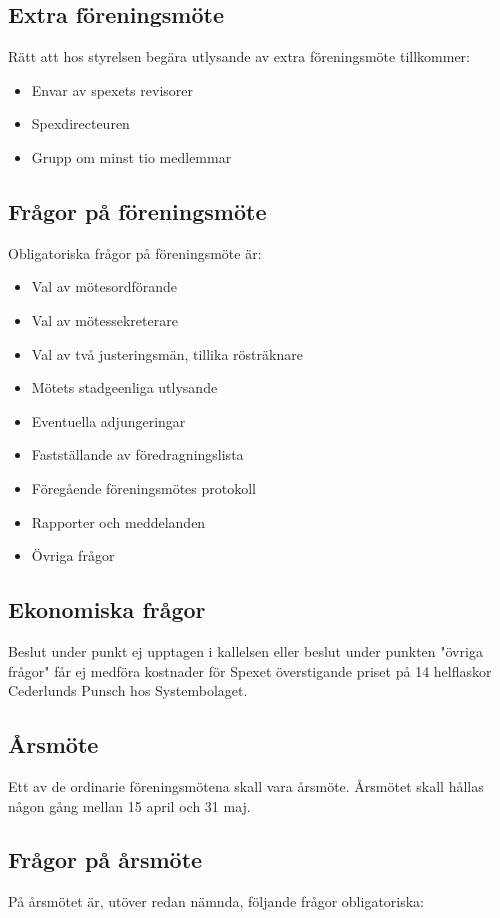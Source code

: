 \documentclass[a4paper]{article}
\begin{document}
\subsection{Extra föreningsmöte}
Rätt att hos styrelsen begära utlysande av extra föreningsmöte tillkommer:

\begin{itemize}
  \item Envar av spexets revisorer
  \item Spexdirecteuren
  \item Grupp om minst tio medlemmar
\end{itemize}

\subsection{Frågor på föreningsmöte}
Obligatoriska frågor på föreningsmöte är:

\begin{itemize}
  \item Val av mötesordförande
  \item Val av mötessekreterare
  \item Val av två justeringsmän, tillika rösträknare
  \item Mötets stadgeenliga utlysande
  \item Eventuella adjungeringar
  \item Fastställande av föredragningslista
  \item Föregående föreningsmötes protokoll
  \item Rapporter och meddelanden
  \item Övriga frågor
\end{itemize}

\subsection{Ekonomiska frågor}
Beslut under punkt ej upptagen i kallelsen eller beslut under punkten "övriga frågor" får ej medföra kostnader för Spexet överstigande priset på 14 helflaskor Cederlunds Punsch hos Systembolaget.

\subsection{Årsmöte}
Ett av de ordinarie föreningsmötena skall vara årsmöte. Årsmötet skall hållas någon gång mellan 15 april och 31 maj.

\subsection{Frågor på årsmöte}
På årsmötet är, utöver redan nämnda, följande frågor obligatoriska:
\end{document}
